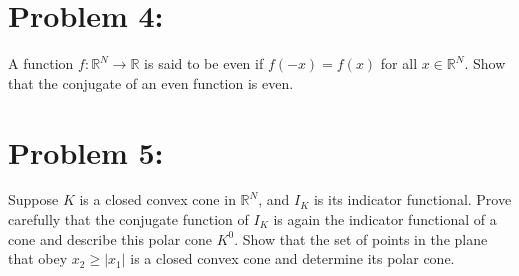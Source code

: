 \documentclass[12pt]{report}
\begin{document}
\section*{Problem 4:}
A function $f:\mathbb{R}^N\to\mathbb{R}$ is said to be even if $f(-x) = f(x)$ for all $x \in \mathbb{R}^N$. Show that the
conjugate of an even function is even.\\

\section*{Problem 5:}
Suppose $K$ is a closed convex cone in $\mathbb{R}^N$, and $I_K$ is its indicator functional. Prove carefully that the conjugate
function of $I_K$ is again the indicator functional of a cone and describe this polar cone $K^0$. Show that the set of points in
the plane that obey $x_2 \geq |x_1|$ is a closed convex cone and determine its polar cone.
\end{document}
